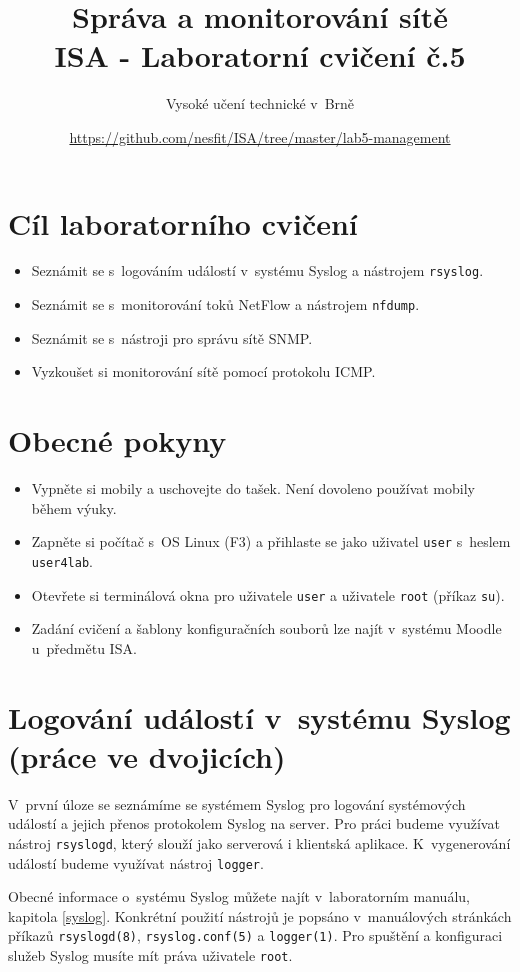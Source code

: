 \documentclass[a4paper,11pt]{article}
\title{Správa a monitorování sítě\\
{\bf\large ISA - Laboratorní cvičení č.5}}
\author{Vysoké učení technické v~Brně}
\date{\url{https://github.com/nesfit/ISA/tree/master/lab5-management}}
\begin{document}
{\let\newpage\relax\maketitle}

\section*{Cíl laboratorního cvičení}
\begin{itemize}
  \item Seznámit se s~logováním událostí v~systému Syslog a nástrojem {\tt rsyslog}.
  \item Seznámit se s~monitorování toků NetFlow a nástrojem {\tt nfdump}.
  \item Seznámit se s~nástroji pro správu sítě SNMP.
  \item Vyzkoušet si monitorování sítě pomocí protokolu ICMP.
\end{itemize}

\section*{Obecné pokyny}
\begin{itemize}
  \item Vypněte si mobily a uschovejte do tašek. Není dovoleno používat mobily během výuky.
  \item Zapněte si počítač s~OS Linux (F3) a přihlaste se jako uživatel {\tt user} s~heslem {\tt user4lab}.
  \item Otevřete si terminálová okna pro uživatele {\tt user} a uživatele {\tt root} (příkaz {\tt su}).
  \item Zadání cvičení a šablony konfiguračních souborů lze najít v~systému Moodle u~předmětu ISA.
\end{itemize}

\section{Logování událostí v~systému Syslog (práce ve dvojicích)}
V~první úloze se seznámíme se systémem Syslog pro logování systémových událostí a jejich přenos protokolem Syslog na server.
Pro práci budeme využívat nástroj {\tt rsyslogd}, který slouží jako serverová i klientská aplikace. K~vygenerování událostí budeme využívat nástroj {\tt logger}.

Obecné informace o~systému Syslog můžete najít v~laboratorním manuálu, kapitola \ref{syslog}. Konkrétní použití nástrojů je popsáno v~manuálových stránkách příkazů  {\tt rsyslogd(8)}, {\tt rsyslog.conf(5)} a  {\tt logger(1)}. Pro spuštění a konfiguraci služeb Syslog musíte mít práva uživatele {\tt root}.
\end{document}

